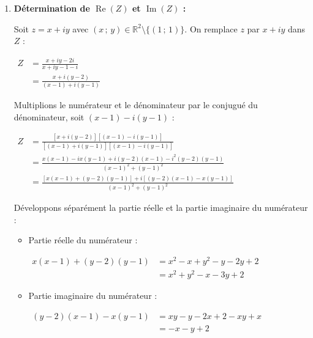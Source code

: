 \documentclass[12pt,a4paper]{article}
\begin{document}
\begin{enumerate}
    \item \textbf{Détermination de $\operatorname{Re}(Z)$ et $\operatorname{Im}(Z)$ :}
    
    Soit $z = x + iy$ avec $(x\,;\,y) \in \mathbb{R}^2 \setminus \{(1\,;\,1)\}$. On remplace $z$ par $x + iy$ dans $Z$ :
    
    $
    \begin{aligned}
        Z &= \frac{x + iy - 2i}{x + iy - 1 - i}\\
        &= \frac{x + i(y - 2)}{(x - 1) + i(y - 1)}
    \end{aligned}
    $
    
    Multiplions le numérateur et le dénominateur par le conjugué du dénominateur, soit $(x - 1) - i(y - 1)$ :
    
    $
    \begin{aligned}
        Z &= \frac{[x + i(y - 2)][(x - 1) - i(y - 1)]}{[(x - 1) + i(y - 1)][(x - 1) - i(y - 1)]}\\
        &= \frac{x(x - 1) - ix(y - 1) + i(y - 2)(x - 1) - i^2(y - 2)(y - 1)}{(x - 1)^2 + (y - 1)^2}\\
        &= \frac{[x(x - 1) + (y - 2)(y - 1)] + i[(y - 2)(x - 1) - x(y - 1)]}{(x - 1)^2 + (y - 1)^2}
    \end{aligned}
    $
    
    Développons séparément la partie réelle et la partie imaginaire du numérateur :
    
    \begin{itemize}
        \item Partie réelle du numérateur :
        
        $
        \begin{aligned}
            x(x - 1) + (y - 2)(y - 1) &= x^2 - x + y^2 - y - 2y + 2\\
            &= x^2 + y^2 - x - 3y + 2
        \end{aligned}
        $
        
        \item Partie imaginaire du numérateur :
        
        $
        \begin{aligned}
            (y - 2)(x - 1) - x(y - 1) &= xy - y - 2x + 2 - xy + x\\
            &= -x - y + 2
        \end{aligned}
        $
    \end{itemize}
    

\end{enumerate}
\end{document}
